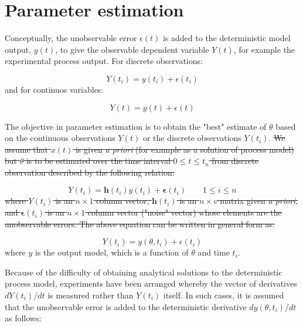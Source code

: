 \documentclass[a4paper,fleqn]{cas-dc}
\begin{document}
\clearpage

\section{Parameter estimation} \label{CH: Parameter_estimation}

Conceptually, the unobservable error $\epsilon(t)$ is added to the deterministic model output, $y(t)$, to give the observable dependent variable $Y(t)$, for example the experimental process output. For discrete observations:

{\footnotesize
	\begin{equation}
		Y(t_i) = y(t_i) + \epsilon(t_i)
\end{equation} }
and for continuos variables:

{\footnotesize
\begin{equation}
	Y(t) = y(t) + \epsilon(t)
\end{equation} }

The objective in parameter estimation is to obtain the "best" estimate of $\theta$ based on the continuous observations $Y(t)$ or the discrete observations $Y(t_i)$. 
\sout{
We assume that $x(t)$ is given \textit{a priori} (for example as a solution of process model) but $\theta$ is to be estimated over the time interval $0 \leq t \leq t_n$ from discrete observation described by the following relation:}

{\footnotesize
\begin{equation}
	 Y(t_i) = \textbf{h}(t_i)y(t_i) + \boldsymbol{\epsilon}(t_i) \qquad 1 \leq i \leq n
\end{equation} }
\sout{where $ Y(t_i)$ is an $n \times 1$ column vector, $\textbf{h}(t_i)$ is an $n \times v$ matrix given \textit{a priori}, and $ \boldsymbol{\epsilon} (t_i)$ is an $n \times 1$ column vector ("noise" vector) whose elements are the unobservable errors. The above equation can be written in general form as:}

{\footnotesize
\begin{equation} \label{EQ: Measurment_noise}
	 Y(t_i) = y(\theta, t_i) + \epsilon(t_i)
\end{equation}}
where $y$ is the output model, which is a function of $\theta$ and time $t_i$.

Because of the difficulty of obtaining analytical solutions to the deterministic process model, experiments have been arranged whereby the vector of derivatives $d Y(t_i)/dt$ is measured rather than $Y(t_i)$ itself. In such cases, it is assumed that the unobservable error is added to the deterministic derivative $dy(\theta, t_i)/dt$ as follows:
\end{document}
